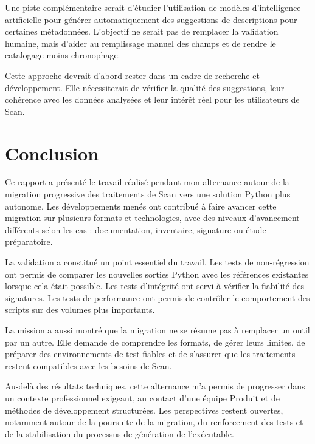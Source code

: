 Une piste complémentaire serait d'étudier l'utilisation de modèles
d'intelligence artificielle pour générer automatiquement des suggestions de
descriptions pour certaines métadonnées. L'objectif ne serait pas de remplacer
la validation humaine, mais d'aider au remplissage manuel des champs et de
rendre le catalogage moins chronophage.

Cette approche devrait d'abord rester dans un cadre de recherche et
développement. Elle nécessiterait de vérifier la qualité des suggestions, leur
cohérence avec les données analysées et leur intérêt réel pour les utilisateurs
de Scan.



\section{Conclusion}
\label{sec:conclusion_generale}

Ce rapport a présenté le travail réalisé pendant mon alternance autour de la
migration progressive des traitements de Scan vers une solution Python plus
autonome. Les développements menés ont contribué à faire avancer cette
migration sur plusieurs formats et technologies, avec des niveaux d'avancement
différents selon les cas : documentation, inventaire, signature ou étude
préparatoire.

La validation a constitué un point essentiel du travail. Les tests de
non-régression ont permis de comparer les nouvelles sorties Python avec les
références existantes lorsque cela était possible. Les tests d'intégrité ont
servi à vérifier la fiabilité des signatures. Les tests de performance ont
permis de contrôler le comportement des scripts sur des volumes plus importants.

La mission a aussi montré que la migration ne se résume pas à remplacer un outil
par un autre. Elle demande de comprendre les formats, de gérer leurs limites, de
préparer des environnements de test fiables et de s'assurer que les traitements
restent compatibles avec les besoins de Scan.

Au-delà des résultats techniques, cette alternance m'a permis de progresser dans
un contexte professionnel exigeant, au contact d'une équipe Produit et de
méthodes de développement structurées. Les perspectives restent ouvertes,
notamment autour de la poursuite de la migration, du renforcement des tests et
de la stabilisation du processus de génération de l'exécutable.
